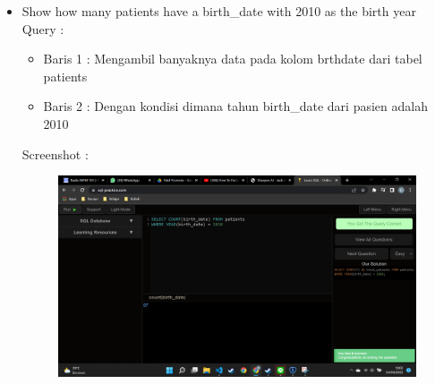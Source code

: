\documentclass[]{article}
\begin{document}
\begin{itemize}
        \item Show how many patients have a birth\_date with 2010 as the birth year
        \\Query :
        
        \begin{itemize}
            \item Baris 1 : Mengambil banyaknya data pada kolom brthdate dari tabel patients
            \item Baris 2 : Dengan kondisi dimana tahun birth\_date dari pasien adalah 2010
        \end{itemize}
        Screenshot :
        \begin{figure}[h]
            \includegraphics[scale=0.3]{./Screenshot/Easy-8.png}
            \centering
        \end{figure}


\end{itemize}
\end{document}
